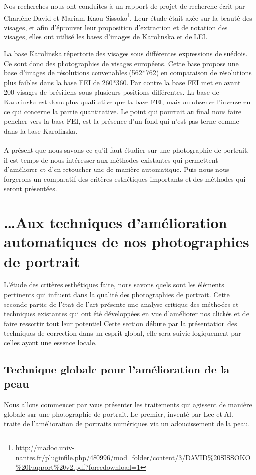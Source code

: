 \documentclass[11pt, french,screen]{report-rd-info}
\begin{document}
Nos recherches nous ont conduites à un rapport de projet de recherche écrit par Charlène David et Mariam-Kaou Sissoko\footnote{\url{http://madoc.univ-nantes.fr/pluginfile.php/480996/mod_folder/content/3/DAVID\%20SISSOKO\%20Rapport\%20v2.pdf?forcedownload=1}}. Leur étude était axée sur la beauté des visages, et afin d'éprouver leur proposition d'extraction et de notation des visages, elles ont utilisé les bases d'images de Karolinska et de LEI.

La base Karolinska répertorie des visages sous différentes expressions de suédois. Ce sont donc des photographies de visages européens. Cette base propose une base d'images de résolutions convenables (562*762) en comparaison de résolutions plus faibles dans la base FEI de 260*360. Par contre la base FEI met en avant 200 visages de brésiliens sous plusieurs positions différentes. La base de Karolinska est donc plus qualitative que la base FEI, mais on observe l'inverse en ce qui concerne la partie quantitative. Le point qui pourrait au final nous faire pencher vers la base FEI, est la présence d'un fond qui n'est pas terne comme dans la base Karolinska.
\paragraph*{}
A présent que nous savons ce qu'il faut étudier sur une photographie de portrait, il est temps de nous intéresser aux méthodes existantes qui permettent d'améliorer et d’en retoucher une de manière automatique. Puis nous nous forgerons un comparatif des critères esthétiques importants et des méthodes qui seront présentées.

\section{\ldots Aux techniques d’amélioration automatiques de nos photographies de portrait}
L’étude des critères esthétiques faite, nous savons quels sont les éléments pertinents qui influent dans la qualité des photographies de portrait. Cette seconde partie de l’état de l’art présente une analyse critique des méthodes et techniques existantes qui ont été développées en vue d’améliorer nos clichés et de faire ressortir tout leur potentiel
Cette section débute par la présentation des techniques de correction dans un esprit global, elle sera suivie logiquement par celles ayant une essence locale.
\subsection{Technique globale pour l’amélioration de la peau}
Nous allons commencer par vous présenter les traitements qui agissent de manière globale sur une photographie de portrait. Le premier, inventé par Lee et Al.\cite{Lee} traite de l'amélioration de portraits numériques via un adoucissement de la peau.
\end{document}
